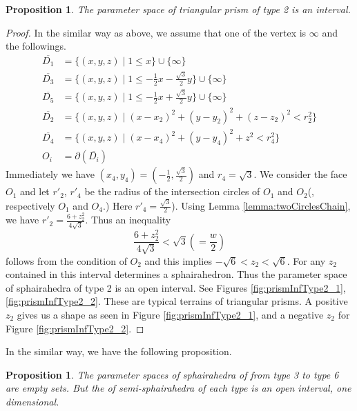 \documentclass[suppldata, dvipdfmx]{interact}
\theoremstyle{plain}%
\newtheorem{proposition}[theorem]{Proposition}
\theoremstyle{definition}
\theoremstyle{remark}
\theoremstyle{problemstyle}
\begin{document}
\begin{proposition}\label{prop:paraSpace_TriangularPrismType2}
The parameter space of triangular prism of type 2 is an interval.  
\end{proposition}

\begin{proof}
In the similar way as above, we assume that one of the vertex is $\infty$ and the followings.
\begin{align*}
\overline{D_1}&= \{ (x,y,z) \mid 1 \le x \} \cup \{ \infty \}\\
\overline{D_3}&=\{(x,y,z) \mid 1 \le -\frac{1}{2}x-\frac{\sqrt{3}}{2}y \} \cup\{\infty\}\\
\overline{D_5}&=\{(x,y,z) \mid 1 \le -\frac{1}{2}x+\frac{\sqrt{3}}{2}y \} \cup\{\infty\}\\
\overline{D_2}&=\{(x,y,z) \mid (x-x_2)^2+(y-y_2)^2+(z-z_2)^2<r_2^2 \} \\
\overline{D_4}&=\{(x,y,z) \mid (x-x_4)^2+(y-y_4)^2+z^2<r_4^2 \} \\
O_i &= \partial(\overline{D_i})
\end{align*}
Immediately we have $(x_4, y_4)=(-\frac{1}{2},\frac{\sqrt{3}}{2})$ and $r_4=\sqrt{3}$.  We consider the face $O_1$ and let $r'_2$, $r'_4$ be the radius of the intersection circles of $O_1$ and $O_2$(, respectively $O_1$ and $O_4$.)  Here $r'_4=\frac{\sqrt{3}}{2}$).  Using Lemma \ref{lemma:twoCirclesChain}, we have 
$r'_2=\frac{6+z_2^2}{4\sqrt{3}}$.  Thus an inequality
\[
\frac{6+z_2^2}{4\sqrt{3}}<\sqrt{3}(=\frac{w}{2})
\]
follows from the condition of $O_2$ and this implies $-\sqrt{6}<z_2<\sqrt{6}$.  For any $z_2$ contained in this interval determines a sphairahedron.  Thus the parameter space of sphairahedra of type 2 is an open interval.
See Figures \ref{fig:prismInfType2_1}, \ref{fig:prismInfType2_2}.  These are typical terrains of triangular prisms.  A positive $z_2$ gives us a shape as seen in Figure \ref{fig:prismInfType2_1}, and a negative $z_2$ for Figure \ref{fig:prismInfType2_2}.    
\end{proof}

In the similar way, we have the following proposition.

\begin{proposition}\label{prop:paraSpace_TriangularPrism3to6}
The parameter spaces of sphairahedra of from type 3 to type 6 are empty sets.  But the of semi-sphairahedra of each type is an open interval, one dimensional.
\end{proposition}
\end{document}
